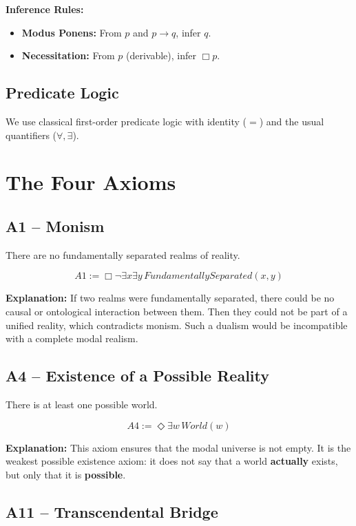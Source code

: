 \documentclass[
]{article}
\begin{document}
\textbf{Inference Rules:}
\begin{itemize}
\item \textbf{Modus Ponens:} From \(p\) and \(p \rightarrow q\), infer \(q\).
\item \textbf{Necessitation:} From \(p\) (derivable), infer \(\Box p\).
\end{itemize}

\subsection{Predicate Logic}\label{predicate-logic}

We use classical first-order predicate logic with identity (\(=\)) and the usual quantifiers (\(\forall, \exists\)).

\section{The Four Axioms}\label{the-four-axioms}

\subsection{A1 – Monism}\label{a1-monism}

There are no fundamentally separated realms of reality.

\[
\boxed{A1 := \Box\neg\exists x\exists y\, FundamentallySeparated(x,y)}
\]

\textbf{Explanation:} If two realms were fundamentally separated, there could be no causal or ontological interaction between them. Then they could not be part of a unified reality, which contradicts monism. Such a dualism would be incompatible with a complete modal realism.

\subsection{A4 – Existence of a Possible Reality}\label{a4-existence-of-a-possible-reality}

There is at least one possible world.

\[
\boxed{A4 := \Diamond\exists w\, World(w)}
\]

\textbf{Explanation:} This axiom ensures that the modal universe is not empty. It is the weakest possible existence axiom: it does not say that a world \textbf{actually} exists, but only that it is \textbf{possible}.

\subsection{A11 – Transcendental Bridge}\label{a11-transcendental-bridge}
\end{document}
